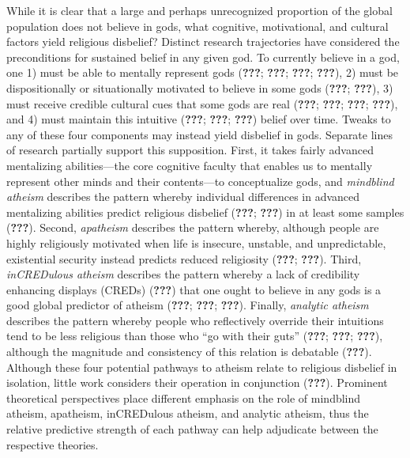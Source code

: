 \documentclass[english,man,mask]{article}
\begin{document}
While it is clear that a large and perhaps unrecognized proportion of the global population does not believe in gods, what cognitive, motivational, and cultural factors yield religious disbelief? Distinct research trajectories have considered the preconditions for sustained belief in any given god. To currently believe in a god, one 1) must be able to mentally represent gods ({\textbf{???}}; {\textbf{???}}; {\textbf{???}}; {\textbf{???}}), 2) must be dispositionally or situationally motivated to believe in some gods ({\textbf{???}}; {\textbf{???}}), 3) must receive credible cultural cues that some gods are real ({\textbf{???}}; {\textbf{???}}; {\textbf{???}}; {\textbf{???}}), and 4) must maintain this intuitive ({\textbf{???}}; {\textbf{???}}; {\textbf{???}}) belief over time. Tweaks to any of these four components may instead yield disbelief in gods. Separate lines of research partially support this supposition. First, it takes fairly advanced mentalizing abilities---the core cognitive faculty that enables us to mentally represent other minds and their contents---to conceptualize gods, and \emph{mindblind atheism} describes the pattern whereby individual differences in advanced mentalizing abilities predict religious disbelief ({\textbf{???}}; {\textbf{???}}) in at least some samples ({\textbf{???}}). Second, \emph{apatheism} describes the pattern whereby, although people are highly religiously motivated when life is insecure, unstable, and unpredictable, existential security instead predicts reduced religiosity ({\textbf{???}}; {\textbf{???}}). Third, \emph{inCREDulous atheism} describes the pattern whereby a lack of credibility enhancing displays (CREDs) ({\textbf{???}}) that one ought to believe in any gods is a good global predictor of atheism ({\textbf{???}}; {\textbf{???}}; {\textbf{???}}). Finally, \emph{analytic atheism} describes the pattern whereby people who reflectively override their intuitions tend to be less religious than those who \enquote{go with their guts} ({\textbf{???}}; {\textbf{???}}; {\textbf{???}}), although the magnitude and consistency of this relation is debatable ({\textbf{???}}). Although these four potential pathways to atheism relate to religious disbelief in isolation, little work considers their operation in conjunction ({\textbf{???}}). Prominent theoretical perspectives place different emphasis on the role of mindblind atheism, apatheism, inCREDulous atheism, and analytic atheism, thus the relative predictive strength of each pathway can help adjudicate between the respective theories.
\end{document}
